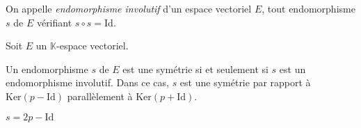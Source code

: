\documentclass[a4paper,10pt]{report}
\begin{document}
\begin{preuve}
\vspace{8cm}
\newpage
\phantom{test}

\vspace{7.5cm}
\end{preuve}

\begin{defin} On appelle \textit{endomorphisme involutif} d'un espace vectoriel $E$, tout endomorphisme $s$ de $E$ vérifiant \newline $s \circ s = \textrm{Id}$.
\end{defin}

\begin{prop} Soit $E$ un $\mathbb{K}$-espace vectoriel.

\noindent Un endomorphisme $s$ de $E$ est une symétrie si et seulement si $s$ est un endomorphisme involutif. Dans ce cas, $s$ est une symétrie par rapport à $\textrm{Ker}(p-\textrm{Id})$ parallèlement à $\textrm{Ker}(p+\textrm{Id})$.
\end{prop}

\vspace{13cm}

\begin{retenir} $s=2p-\textrm{Id}$
\end{retenir}
\end{document}
